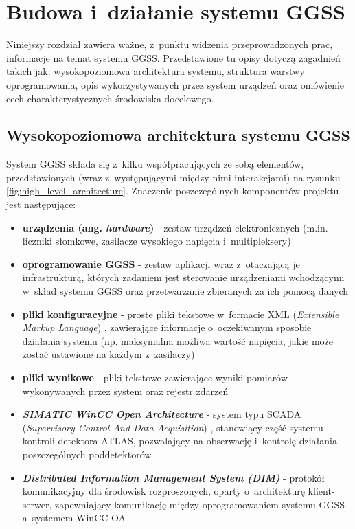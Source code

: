 \chapter{Budowa i~działanie systemu GGSS}
\label{cha:ggss}

\graphicspath{{3_ggss_introduction/static/}}

Niniejszy rozdział zawiera ważne, z~punktu widzenia przeprowadzonych prac, informacje na temat systemu GGSS. Przedstawione tu opisy dotyczą zagadnień takich jak: wysokopoziomowa architektura systemu, struktura warstwy oprogramowania, opis wykorzystywanych przez system urządzeń oraz omówienie cech charakterystycznych środowiska docelowego. 

\section{Wysokopoziomowa architektura systemu GGSS}
System GGSS składa się z~kilku współpracujących ze sobą elementów, przedstawionych (wraz z~występującymi między nimi interakcjami) na rysunku \ref{fig:high_level_architecture}. Znaczenie poszczególnych komponentów projektu jest następujące:
\begin{itemize}
    \item \textbf{urządzenia (ang. \emph{hardware})} - zestaw urządzeń elektronicznych (m.in. liczniki słomkowe, zasilacze wysokiego napięcia i~multipleksery)
    \item \textbf{oprogramowanie GGSS} - zestaw aplikacji wraz z~otaczającą je infrastrukturą, których zadaniem jest sterowanie urządzeniami wchodzącymi w~skład systemu GGSS oraz przetwarzanie zbieranych za ich pomocą danych
    \item \textbf{pliki konfiguracyjne} - proste pliki tekstowe w~formacie XML (\emph{Extensible Markup Language}) \cite{XML_wikipedia}, zawierające informacje o~oczekiwanym sposobie działania systemu (np. maksymalna możliwa wartość napięcia, jakie może zostać ustawione na każdym z~zasilaczy)
    \item \textbf{pliki wynikowe} - pliki tekstowe zawierające wyniki pomiarów wykonywanych przez system oraz rejestr zdarzeń 
    \item \emph{\textbf{SIMATIC WinCC Open Architecture}} \cite{winccoa} - system typu SCADA (\emph{Supervisory Control And Data Acquisition}) \cite{SCADA_wikipedia}, stanowiący część systemu kontroli detektora ATLAS, pozwalający na obserwację i~kontrolę działania poszczególnych poddetektorów
    \item \emph{\textbf{Distributed Information Management System (DIM)}} \cite{DIMwebsite} - protokół komunikacyjny dla środowisk rozproszonych, oparty o~architekturę klient-serwer, zapewniający komunikację między oprogramowaniem systemu GGSS a~systemem WinCC OA
\end{itemize}

